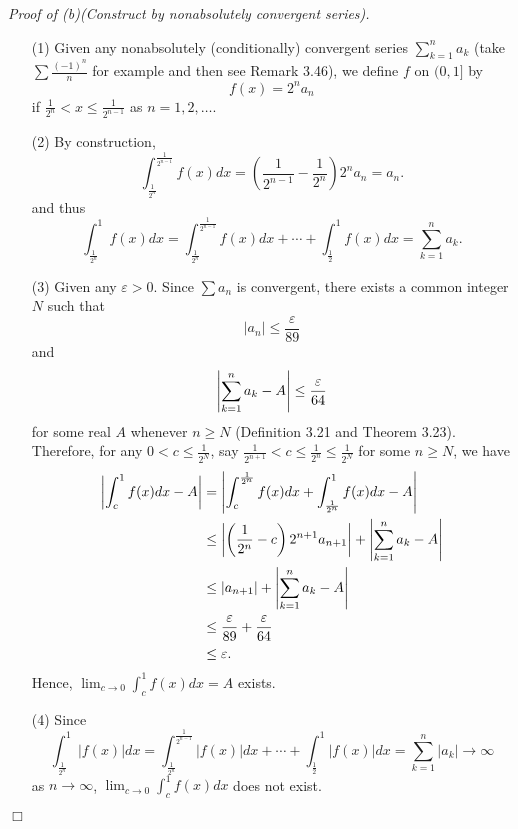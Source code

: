 \documentclass{article}
\begin{document}
\emph{Proof of (b)(Construct by nonabsolutely convergent series).}
\begin{enumerate}
\item[(1)]
Given any nonabsolutely (conditionally) convergent series $\sum_{k=1}^{n} a_k$
(take $\sum \frac{(-1)^n}{n}$ for example and then see Remark 3.46),
we define $f$ on $(0,1]$ by
\[
  f(x) = 2^{n} a_n
\]
if $\frac{1}{2^{n}} < x \leq \frac{1}{2^{n-1}}$ as $n = 1,2,\ldots$.

\item[(2)]
By construction,
\[
  \int_{\frac{1}{2^{n}}}^{\frac{1}{2^{n-1}}} f(x) dx
  = \left( \frac{1}{2^{n-1}} - \frac{1}{2^{n}}\right) 2^n a_n = a_n.
\]
and thus
\[
  \int_{\frac{1}{2^{n}}}^{1} f(x) dx
  = \int_{\frac{1}{2^{n}}}^{\frac{1}{2^{n-1}}} f(x) dx
    + \cdots
    + \int_{\frac{1}{2}}^{1} f(x) dx
  = \sum_{k=1}^{n} a_k.
\]

\item[(3)]
Given any $\varepsilon > 0$.
Since $\sum a_n$ is convergent, there exists a common integer $N$
such that
\[
  |a_n| \leq \frac{\varepsilon}{89}
\]
and
\[
  \abs{ \sum_{k=1}^{n} a_k - A } \leq \frac{\varepsilon}{64}
\]
for some real $A$ whenever $n \geq N$
(Definition 3.21 and Theorem 3.23).
Therefore, for any $0 < c \leq \frac{1}{2^N}$,
say $\frac{1}{2^{n+1}} < c \leq \frac{1}{2^n} \leq \frac{1}{2^N}$ for some $n \geq N$,
we have
\begin{align*}
  \abs{ \int_{c}^{1} f(x) dx - A }
  &= \abs{ \int_{c}^{\frac{1}{2^{n}}} f(x) dx
    + \int_{\frac{1}{2^{n}}}^{1} f(x) dx
    - A } \\
  &\leq \abs{ \left( \frac{1}{2^{n}} - c \right) 2^{n+1} a_{n+1} }
    + \abs{ \sum_{k=1}^{n} a_k - A } \\
  &\leq \abs{ a_{n+1} } + \abs{ \sum_{k=1}^{n} a_k - A } \\
  &\leq \frac{\varepsilon}{89} + \frac{\varepsilon}{64} \\
  &\leq \varepsilon.
\end{align*}
Hence, $\lim_{c \to 0} \int_{c}^{1} f(x) dx = A$ exists.

\item[(4)]
Since
\[
  \int_{\frac{1}{2^{n}}}^{1} |f(x)| dx
  = \int_{\frac{1}{2^{n}}}^{\frac{1}{2^{n-1}}} |f(x)| dx
    + \cdots
    + \int_{\frac{1}{2}}^{1} |f(x)| dx
  = \sum_{k=1}^{n} |a_k| \to \infty
\]
as $n \to \infty$,
$\lim_{c \to 0} \int_{c}^{1}f(x)dx$ does not exist.
\end{enumerate}
$\Box$ \\\\
\end{document}
